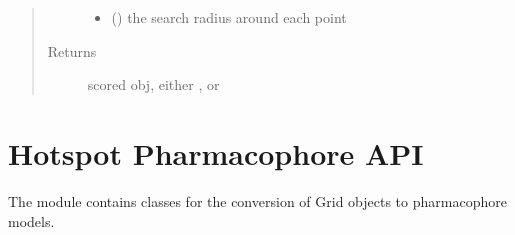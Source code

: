 \documentclass[letterpaper,10pt,english]{sphinxmanual}
\begin{document}
\begin{fulllineitems}
\begin{fulllineitems}
\begin{quote}
\begin{description}
\begin{itemize}
\item {} 
 () \textendash{} the search radius around each point

\end{itemize}

\item[{Returns}] \leavevmode
scored obj, either ,  or 

\end{description}\end{quote}

\begin{sphinxVerbatim}[commandchars=\\\{\}]
          
\end{sphinxVerbatim}

\begin{sphinxVerbatim}[commandchars=\\\{\}]
   
      
\PYG{p}{[}        \PYG{p}{]}
\end{sphinxVerbatim}

\end{fulllineitems}


\end{fulllineitems}



\chapter{Hotspot Pharmacophore API}
\label{\detokenize{hs_pharmacophore_api:module-hotspots.hs_pharmacophore}}\label{\detokenize{hs_pharmacophore_api:hotspot-pharmacophore-api}}\label{\detokenize{hs_pharmacophore_api::doc}}
The {\hyperref[\detokenize{hs_pharmacophore_api:module-hotspots.hs_pharmacophore}]{}} module contains classes for the
conversion of Grid objects to pharmacophore models.
\end{document}
